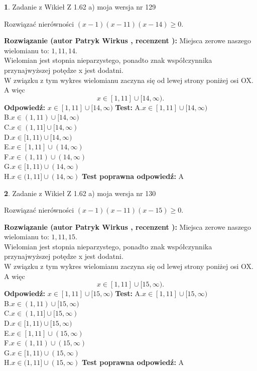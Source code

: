 \documentclass[12pt, a4paper]{article}
\theoremstyle{definition} %
\newtheorem{zad}{}
\newcommand{\zadStart}[1]{\begin{zad}#1\newline}
\newcommand{\zadStop}{\end{zad}}
\newcommand{\rozwStart}[2]{\noindent \textbf{Rozwiązanie (autor #1 , recenzent #2): }\newline}
\newcommand{\rozwStop}{\newline}
\newcommand{\odpStart}{\noindent \textbf{Odpowiedź:}\newline}
\newcommand{\odpStop}{\newline}
\newcommand{\testStart}{\noindent \textbf{Test:}\newline}
\newcommand{\testStop}{\newline}
\newcommand{\kluczStart}{\noindent \textbf{Test poprawna odpowiedź:}\newline}
\newcommand{\kluczStop}{\newline}
\begin{document}
\zadStart{Zadanie z Wikieł Z 1.62 a) moja wersja nr 129}

Rozwiązać nierówności $(x-1)(x-11)(x-14)\ge0$.
\zadStop
\rozwStart{Patryk Wirkus}{}
Miejsca zerowe naszego wielomianu to: $1, 11, 14$.\\
Wielomian jest stopnia nieparzystego, ponadto znak współczynnika przy\linebreak najwyższej potędze x jest dodatni.\\ W związku z tym wykres wielomianu zaczyna się od lewej strony poniżej osi OX. A więc $$x \in [1,11] \cup [14,\infty).$$
\rozwStop
\odpStart
$x \in [1,11] \cup [14,\infty)$
\odpStop
\testStart
A.$x \in [1,11] \cup [14,\infty)$\\
B.$x \in (1,11) \cup [14,\infty)$\\
C.$x \in (1,11] \cup [14,\infty)$\\
D.$x \in [1,11) \cup [14,\infty)$\\
E.$x \in [1,11] \cup (14,\infty)$\\
F.$x \in (1,11) \cup (14,\infty)$\\
G.$x \in [1,11) \cup (14,\infty)$\\
H.$x \in (1,11] \cup (14,\infty)$
\testStop
\kluczStart
A
\kluczStop



\zadStart{Zadanie z Wikieł Z 1.62 a) moja wersja nr 130}

Rozwiązać nierówności $(x-1)(x-11)(x-15)\ge0$.
\zadStop
\rozwStart{Patryk Wirkus}{}
Miejsca zerowe naszego wielomianu to: $1, 11, 15$.\\
Wielomian jest stopnia nieparzystego, ponadto znak współczynnika przy\linebreak najwyższej potędze x jest dodatni.\\ W związku z tym wykres wielomianu zaczyna się od lewej strony poniżej osi OX. A więc $$x \in [1,11] \cup [15,\infty).$$
\rozwStop
\odpStart
$x \in [1,11] \cup [15,\infty)$
\odpStop
\testStart
A.$x \in [1,11] \cup [15,\infty)$\\
B.$x \in (1,11) \cup [15,\infty)$\\
C.$x \in (1,11] \cup [15,\infty)$\\
D.$x \in [1,11) \cup [15,\infty)$\\
E.$x \in [1,11] \cup (15,\infty)$\\
F.$x \in (1,11) \cup (15,\infty)$\\
G.$x \in [1,11) \cup (15,\infty)$\\
H.$x \in (1,11] \cup (15,\infty)$
\testStop
\kluczStart
A
\kluczStop
\end{document}
